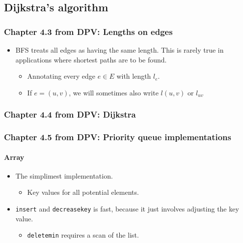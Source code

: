 \documentclass[a4paper,11pt]{article}
\begin{document}
\subsection{Dijkstra's algorithm}\label{dijkstras-algorithm}

\subsubsection{Chapter 4.3 from DPV: Lengths on
edges}\label{chapter-4.3-from-dpv-lengths-on-edges}

\begin{itemize}
\itemsep1pt\parskip0pt
\item
  BFS treats all edges as having the same length. This is rarely true in
  applications where shortest paths are to be found.

  \begin{itemize}
  \itemsep1pt\parskip0pt
  \item
    Annotating every edge $e \in E$ with length $l_e$.
  \item
    If $e = (u, v)$, we will sometimes also write $l(u, v)$ or $l_{uv}$
  \end{itemize}
\end{itemize}

\subsubsection{Chapter 4.4 from DPV:
Dijkstra}\label{chapter-4.4-from-dpv-dijkstra}

\subsubsection{Chapter 4.5 from DPV: Priority queue
implementations}\label{chapter-4.5-from-dpv-priority-queue-implementations}

\paragraph{Array}\label{array}

\begin{itemize}
\itemsep1pt\parskip0pt
\item
  The simplimest implementation.

  \begin{itemize}
  \itemsep1pt\parskip0pt
  \item
    Key values for all potential elements.
  \end{itemize}
\item
  \texttt{insert} and \texttt{decreasekey} is fast, because it just
  involves adjusting the key value.

  \begin{itemize}
  \itemsep1pt\parskip0pt
  \item
    \texttt{deletemin} requires a scan of the list.
  \end{itemize}
\end{itemize}
\end{document}
